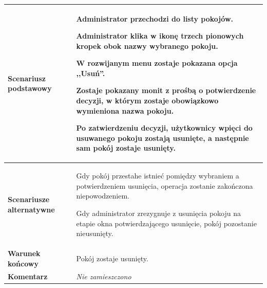 {\begin{tabular}{ | l | l | }
	\hline
		\textbf{Scenariusz podstawowy} & \parbox[t]{11cm}{
			\begin{enumreq}
				\item Administrator przechodzi do listy pokojów.
				\item Administrator klika w ikonę trzech pionowych kropek obok nazwy
				wybranego pokoju.
				\item W rozwijanym menu zostaje pokazana opcja ,,Usuń''.
				\item Zostaje pokazany monit z prośbą o potwierdzenie decyzji, w którym
				zostaje obowiązkowo wymieniona nazwa pokoju.
				\item Po zatwierdzeniu decyzji, użytkownicy wpięci do usuwanego pokoju
				zostają usunięte, a następnie sam pokój zostaje usunięty.
			\end{enumreq}
		}
		\\

	\hline
		\textbf{Scenariusze alternatywne} & \parbox[t]
		{11cm}{
			\begin{enumreq}
				\item Gdy pokój przestahe istnieć pomiędzy wybraniem a potwierdzeniem
				usunięcia, operacja zostanie zakończona niepowodzeniem.
				\item Gdy administrator zrezygnuje z usunięcia pokoju na etapie okna
				potwierdzającego usunięcie, pokój pozostanie nieusunięty.
			\end{enumreq}
		}
		\\

	\hline
		\textbf{Warunek końcowy} & \parbox[t]{11cm}{
			Pokój zostaje usunięty.
		}
		\\

	\hline
		\textbf{Komentarz} & \parbox[t]{11cm}{
			\textit{Nie zamieszczono}
		}
		\\

	\hline
\end{tabular}
}
